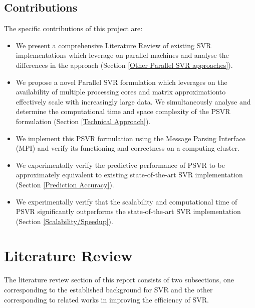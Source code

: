 \documentclass[12pt]{article}
\begin{document}
\subsection{Contributions}
The specific contributions of this project are:
\begin{itemize}
\item We present a comprehensive Literature Review of existing SVR implementations which leverage on parallel machines and analyse the differences in the approach (Section \ref{Other Parallel SVR approaches}).
\item We propose a novel Parallel SVR formulation which leverages on the availability of multiple processing cores and matrix approximation\footnotemark to effectively scale with increasingly large data. We simultaneously analyse and determine the computational time and space complexity of the PSVR formulation (Section \ref{Technical Approach}).
\item We implement this PSVR formulation using the Message Parsing Interface (MPI) and verify its functioning and correctness on a computing cluster.
\item We experimentally verify the predictive performance of PSVR to be approximately equivalent to existing state-of-the-art SVR implementation (Section \ref{Prediction Accuracy}).
\item We experimentally verify that the scalability and computational time of PSVR significantly outperforms the state-of-the-art SVR implementation (Section \ref{Scalability/Speedup}).
\end{itemize}

\cleardoublepage
\section{Literature Review}
The literature review section of this report consists of two subsections, one corresponding to the established background for SVR and the other corresponding to related works in improving the efficiency of SVR.
\end{document}

